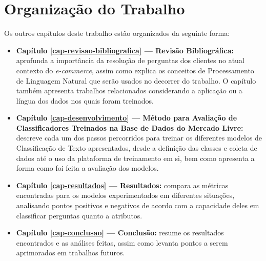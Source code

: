 \section{Organização do Trabalho}
Os outros capítulos deste trabalho estão organizados da seguinte forma:
\begin{itemize}
    \item \textbf{Capítulo \ref{cap-revisao-bibliografica} --- Revisão Bibliográfica:} aprofunda a importância da resolução de perguntas dos clientes no atual contexto do \textit{e-commerce}, assim como explica os conceitos de Processamento de Linguagem Natural que serão usados no decorrer do trabalho. O capítulo também apresenta trabalhos relacionados considerando a aplicação ou a língua dos dados nos quais foram treinados.
    \item \textbf{Capítulo \ref{cap-desenvolvimento} --- Método para Avaliação de Classificadores Treinados na Base de Dados do Mercado Livre:} descreve cada um dos passos percorridos para treinar os diferentes modelos de Classificação de Texto apresentados, desde a definição das classes e coleta de dados até o uso da plataforma de treinamento em si, bem como apresenta a forma como foi feita a avaliação dos modelos.
    \item \textbf{Capítulo \ref{cap-resultados} --- Resultados:} compara as métricas encontradas para os modelos experimentados em diferentes situações, analisando pontos positivos e negativos de acordo com a capacidade deles em classificar perguntas quanto a atributos.
    \item \textbf{Capítulo \ref{cap-conclusao} --- Conclusão:} resume os resultados encontrados e as análises feitas, assim como levanta pontos a serem aprimorados em trabalhos futuros.
\end{itemize}